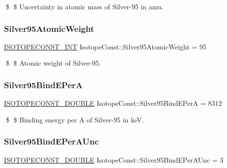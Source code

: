 \$ \$ Uncertainty in atomic mass of Silver-\/95 in amu. \mbox{\label{group___isotope_const-_silver-_ag95_ga32630c8eaa85d095d0c0ee333db22036}} 
\subsubsection{\texorpdfstring{Silver95\+Atomic\+Weight}{Silver95AtomicWeight}}
{\footnotesize\ttfamily \mbox{\hyperlink{group___isotope_const-_macros_ga5f18360b3e99483a35c32d789e62621c}{I\+S\+O\+T\+O\+P\+E\+C\+O\+N\+S\+T\+\_\+\+I\+NT}} Isotope\+Const\+::\+Silver95\+Atomic\+Weight = 95}

\$ \$ Atomic weight of Silver-\/95. \mbox{\label{group___isotope_const-_silver-_ag95_ga5f20fc97dd988bf798fa15334f5c3919}} 
\subsubsection{\texorpdfstring{Silver95\+Bind\+E\+PerA}{Silver95BindEPerA}}
{\footnotesize\ttfamily \mbox{\hyperlink{group___isotope_const-_macros_ga8f45a7272ce02c0b4c65c44636ed719a}{I\+S\+O\+T\+O\+P\+E\+C\+O\+N\+S\+T\+\_\+\+D\+O\+U\+B\+LE}} Isotope\+Const\+::\+Silver95\+Bind\+E\+PerA = 8312}

\$ \$ Binding energy per A of Silver-\/95 in keV. \mbox{\label{group___isotope_const-_silver-_ag95_ga35fa1979bae614c9ca073bb3b453a3b1}} 
\subsubsection{\texorpdfstring{Silver95\+Bind\+E\+Per\+A\+Unc}{Silver95BindEPerAUnc}}
{\footnotesize\ttfamily \mbox{\hyperlink{group___isotope_const-_macros_ga8f45a7272ce02c0b4c65c44636ed719a}{I\+S\+O\+T\+O\+P\+E\+C\+O\+N\+S\+T\+\_\+\+D\+O\+U\+B\+LE}} Isotope\+Const\+::\+Silver95\+Bind\+E\+Per\+A\+Unc = 3}

